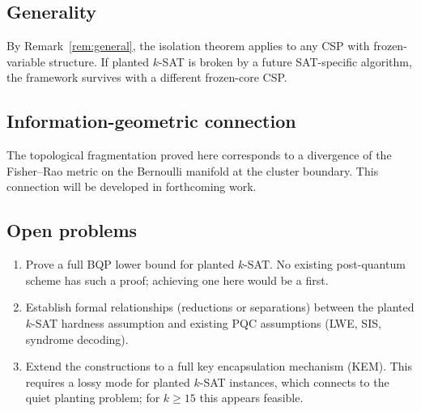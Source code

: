 \documentclass[11pt]{article}
\begin{document}
\subsection{Generality}

By Remark~\ref{rem:general}, the isolation theorem applies to any CSP with frozen-variable structure.  If planted $k$-SAT is broken by a future SAT-specific algorithm, the framework survives with a different frozen-core CSP.


\subsection{Information-geometric connection}

The topological fragmentation proved here corresponds to a divergence of the Fisher--Rao metric on the Bernoulli manifold at the cluster boundary.  This connection will be developed in forthcoming work.


\subsection{Open problems}

\begin{enumerate}[label=(\roman*)]
\item Prove a full BQP lower bound for planted $k$-SAT.  No existing post-quantum scheme has such a proof; achieving one here would be a first.
\item Establish formal relationships (reductions or separations) between the planted $k$-SAT hardness assumption and existing PQC assumptions (LWE, SIS, syndrome decoding).
\item Extend the constructions to a full key encapsulation mechanism (KEM).  This requires a lossy mode for planted $k$-SAT instances, which connects to the quiet planting problem; for $k \geq 15$ this appears feasible.
\end{enumerate}


\end{document}
